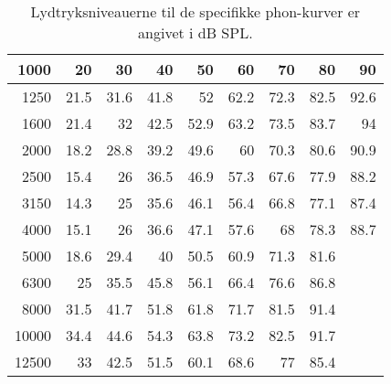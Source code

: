 \begin{table}[H]
{\begin{tabular}{|r|r|r|r|r|r|r|r|r|}
1000 & 20 & 30 & 40 & 50 & 60 & 70 & 80 & 90 \\ \hline
1250 & 21.5 & 31.6 & 41.8 & 52 & 62.2 & 72.3 & 82.5 & 92.6 \\ \hline
1600 & 21.4 & 32 & 42.5 & 52.9 & 63.2 & 73.5 & 83.7 & 94 \\ \hline
2000 & 18.2 & 28.8 & 39.2 & 49.6 & 60 & 70.3 & 80.6 & 90.9 \\ \hline
2500 & 15.4 & 26 & 36.5 & 46.9 & 57.3 & 67.6 & 77.9 & 88.2 \\ \hline
3150 & 14.3 & 25 & 35.6 & 46.1 & 56.4 & 66.8 & 77.1 & 87.4 \\ \hline
4000 & 15.1 & 26 & 36.6 & 47.1 & 57.6 & 68 & 78.3 & 88.7 \\ \hline
5000 & 18.6 & 29.4 & 40 & 50.5 & 60.9 & 71.3 & 81.6 &  \\ \hline
6300 & 25 & 35.5 & 45.8 & 56.1 & 66.4 & 76.6 & 86.8 &  \\ \hline
8000 & 31.5 & 41.7 & 51.8 & 61.8 & 71.7 & 81.5 & 91.4 &  \\ \hline
10000 & 34.4 & 44.6 & 54.3 & 63.8 & 73.2 & 82.5 & 91.7 &  \\ \hline
12500 & 33 & 42.5 & 51.5 & 60.1 & 68.6 & 77 & 85.4 &  \\ \hline
\end{tabular}%
}
\caption{Lydtryksniveauerne til de specifikke phon-kurver er angivet i dB SPL.}
\label{tab:ISO226Raadata}
\end{table}